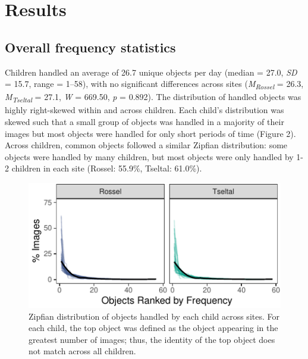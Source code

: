 \documentclass[10pt, letterpaper]{article}
\newenvironment{CodeChunk}{}{}
\begin{document}
\hypertarget{results}{%
\section{Results}\label{results}}

\hypertarget{overall-frequency-statistics}{%
\subsection{Overall frequency
statistics}\label{overall-frequency-statistics}}

Children handled an average of 26.7 unique objects per day (median =
27.0, \emph{SD} = 15.7, range = 1--58), with no significant differences
across sites (\emph{M}\textsubscript{\emph{Rossel}} = 26.3,
\emph{M}\textsubscript{\emph{Tseltal}} = 27.1, \emph{W} = 669.50,
\emph{p} = 0.892). The distribution of handled objects was highly
right-skewed within and across children. Each child's distribution was
skewed such that a small group of objects was handled in a majority of
their images but most objects were handled for only short periods of
time (Figure 2). Across children, common objects followed a similar
Zipfian distribution: some objects were handled by many children, but
most objects were only handled by 1-2 children in each site (Rossel:
55.9\%, Tseltal: 61.0\%).

\begin{CodeChunk}
\begin{figure}[h]

{\centering \includegraphics{figs/zipfian-objects-fig-1} 

}

\caption[Zipfian distribution of objects handled by each child across sites]{Zipfian distribution of objects handled by each child across sites. For each child, the top object was defined as the object appearing in the greatest number of images; thus, the identity of the top object does not match across all children.}\label{fig:zipfian-objects-fig}
\end{figure}
\end{CodeChunk}
\end{document}
